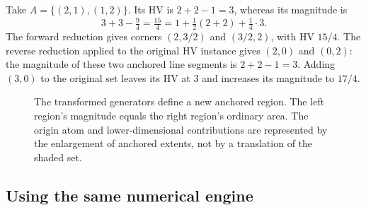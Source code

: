 \begin{example}\label{ex:two-box}
Take $A=\{(2,1),(1,2)\}$. Its HV is $2+2-1=3$, whereas its magnitude is
\[
 3+3-\tfrac94=\tfrac{15}{4}
       =1+\tfrac12(2+2)+\tfrac14\cdot3.
\]
The forward reduction gives corners $(2,3/2)$ and $(3/2,2)$, with HV
$15/4$. The reverse reduction applied to the original HV instance gives
$(2,0)$ and $(0,2)$: the magnitude of these two anchored line segments
is $2+2-1=3$. Adding $(3,0)$ to the original set leaves its HV at $3$
and increases its magnitude to $17/4$.
\end{example}

\begin{figure}[tb]
\centering
{}
\caption{The transformed generators define a new anchored region. The
left region's magnitude equals the right region's ordinary area. The
origin atom and lower-dimensional contributions are represented by the
enlargement of anchored extents, not by a translation of the shaded set.}
\label{fig:shift}
\end{figure}


\subsection{Using the same numerical engine}
\label{app:magnitude-software}


